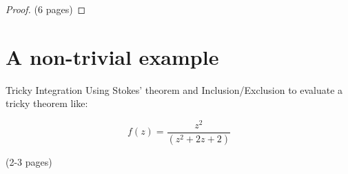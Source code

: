 \begin{proof}
(6 pages)
\end{proof}


\newpage \addtocounter{page}{5}

\section{A non-trivial example}
\begin{example}{Tricky Integration}
Using Stokes' theorem and Inclusion/Exclusion to evaluate a tricky theorem like:

\begin{equation}
f(z) = \frac{z^2}{(z^2 + 2z + 2)}
\end{equation}


 (2-3 pages)


\end{example}

\newpage \addtocounter{page}{2}

